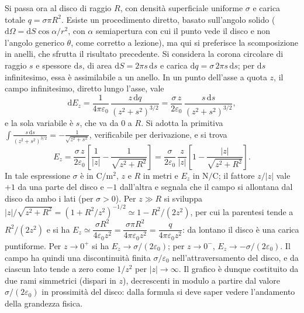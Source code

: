 \documentclass[11pt,a4paper]{article}
\newcommand{\dd}{\mathrm{d}}
\newcommand{\epz}{\varepsilon_0}
\begin{document}
Si passa ora al disco di raggio $R$, con densità superficiale uniforme $\sigma$ e carica totale $q=\sigma\pi R^2$. Esiste un procedimento diretto, basato sull'angolo solido ($\dd\Omega=\dd S\cos\alpha/r^2$, con $\alpha$ semiapertura con cui il punto vede il disco e non l'angolo generico $\theta$, come corretto a lezione), ma qui si preferisce la scomposizione in anelli, che sfrutta il risultato precedente. Si considera la corona circolare di raggio $s$ e spessore $\dd s$, di area $\dd S=2\pi s\,\dd s$ e carica $\dd q=\sigma\,2\pi s\,\dd s$; per $\dd s$ infinitesimo, essa è assimilabile a un anello. In un punto dell'asse a quota $z$, il campo infinitesimo, diretto lungo l'asse, vale
\[
\dd E_z=\frac{1}{4\pi\epz}\,\frac{z\,\dd q}{(z^2+s^2)^{3/2}}=\frac{\sigma\,z}{2\epz}\,\frac{s\,\dd s}{(z^2+s^2)^{3/2}} ,
\]
e la sola variabile è $s$, che va da $0$ a $R$. Si adotta la primitiva $\displaystyle\int\frac{s\,\dd s}{(z^2+s^2)^{3/2}}=-\frac{1}{\sqrt{z^2+s^2}}$, verificabile per derivazione, e si trova
\[
E_z=\frac{\sigma\,z}{2\epz}\left[\frac{1}{|z|}-\frac{1}{\sqrt{z^2+R^2}}\right]
=\frac{\sigma}{2\epz}\,\frac{z}{|z|}\left[1-\frac{|z|}{\sqrt{z^2+R^2}}\right].
\]
In tale espressione $\sigma$ è in $\ensuremath{\mathrm{C/m^2}}$, $z$ e $R$ in metri e $E_z$ in $\ensuremath{\mathrm{N/C}}$; il fattore $z/|z|$ vale $+1$ da una parte del disco e $-1$ dall'altra e segnala che il campo si allontana dal disco da ambo i lati (per $\sigma>0$). Per $z\gg R$ si sviluppa $|z|/\sqrt{z^2+R^2}=(1+R^2/z^2)^{-1/2}\simeq 1-R^2/(2z^2)$, per cui la parentesi tende a $R^2/(2z^2)$ e si ha $E_z\simeq\dfrac{\sigma R^2}{4\epz z^2}=\dfrac{\sigma\pi R^2}{4\pi\epz z^2}=\dfrac{q}{4\pi\epz z^2}$: da lontano il disco è una carica puntiforme. Per $z\to 0^{+}$ si ha $E_z\to\sigma/(2\epz)$; per $z\to 0^{-}$, $E_z\to-\sigma/(2\epz)$. Il campo ha quindi una discontinuità finita $\sigma/\epz$ nell'attraversamento del disco, e da ciascun lato tende a zero come $1/z^2$ per $|z|\to\infty$. Il grafico è dunque costituito da due rami simmetrici (dispari in $z$), decrescenti in modulo a partire dal valore $\sigma/(2\epz)$ in prossimità del disco: dalla formula si deve saper vedere l'andamento della grandezza fisica.
\end{document}
